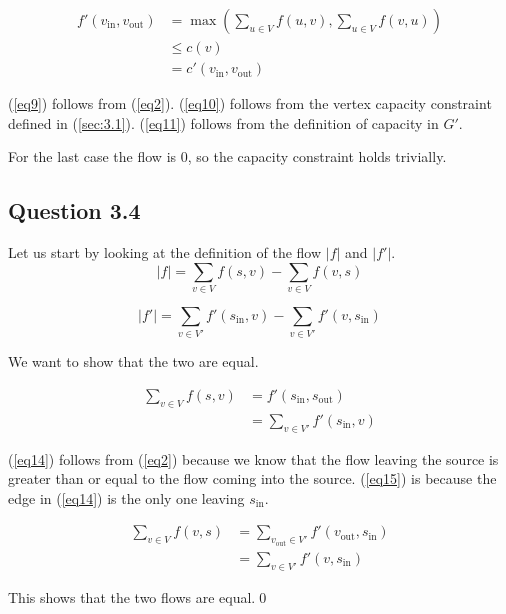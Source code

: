 \documentclass{sig-alternate}
\begin{document}
\begin{align}
    \label{eq9} f'(v_{\text{in}}, v_{\text{out}}) &= \max\left(\sum_{u\in V} f(u, v), \sum_{u\in V} f(v, u)\right) \\
    \label{eq10}    &\leq c(v) \\
    \label{eq11}    &= c'(v_{\text{in}}, v_{\text{out}})
\end{align}

(\ref{eq9}) follows from (\ref{eq2}). (\ref{eq10}) follows from the
vertex capacity constraint defined in (\ref{sec:3.1}).
(\ref{eq11}) follows from the definition of capacity in $G'$.

For the last case the flow is $0$, so the capacity constraint holds trivially.

\subsection*{Question 3.4}

Let us start by looking at the definition of the flow $|f|$ and $|f'|$.
\begin{equation}
    |f| = \sum_{v \in V} f(s,v) - \sum_{v \in V} f(v,s)
\end{equation}

\begin{equation}
    |f'| = \sum_{v \in V'} f'(s_{\text{in}},v) - \sum_{v \in V'} f'(v,s_{\text{in}})
\end{equation}

We want to show that the two are equal.

\begin{align}
    \label{eq14} \sum_{v \in V} f(s, v) &= f'(s_{\text{in}}, s_{\text{out}}) \\
    \label{eq15}    &= \sum_{v \in V'} f'(s_{\text{in}}, v)
\end{align}

(\ref{eq14}) follows from (\ref{eq2}) because we know that the flow leaving
the source is greater than or equal to the flow coming into the source.
(\ref{eq15}) is because the edge in (\ref{eq14}) is the only one leaving
$s_{\text{in}}$.

\begin{align}
    \label{eq16} \sum_{v \in V} f(v, s) &= \sum_{v_{\text{out}} \in V'} f'(v_{\text{out}}, s_{\text{in}}) \\
    \label{eq17}    &= \sum_{v \in V'} f'(v, s_{\text{in}})
\end{align}

This shows that the two flows are equal.\qed


\end{document}
